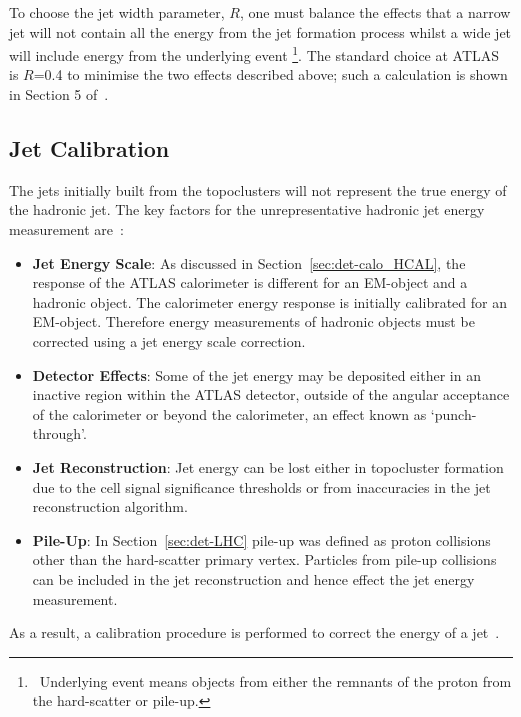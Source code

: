 To choose the jet width parameter, $R$, one must balance the effects that
a narrow jet will not contain all the energy from the jet formation process
whilst a wide jet will include energy from the underlying event \footnote{\  Underlying event means objects from either the remnants of the proton from the hard-scatter or pile-up.}.
The standard choice at ATLAS is $R$=0.4 to minimise the  two effects described above;
such a calculation is shown in Section 5 of~\cite{obj-jets_reco_salam}.


\subsection{Jet Calibration}
\label{sec:obj-jets_calib}

The jets initially built from the topoclusters will not represent the true energy of the hadronic jet.
The key factors for the unrepresentative hadronic jet energy measurement are~\cite{det-thesis_kate,obj-jets_calib_2015}:
\begin{itemize}[leftmargin=*]
\item\textbf{Jet Energy Scale}:
  As discussed in Section~\ref{sec:det-calo_HCAL}, the response of the ATLAS calorimeter is different for an EM-object and a hadronic object.
  The calorimeter energy response is initially calibrated for an EM-object.
  Therefore energy measurements of hadronic objects must be corrected using a jet energy scale correction. \vspace{0.5em}
\item\textbf{Detector Effects}:
  Some of the jet energy may be deposited either in an inactive region within the ATLAS detector,
  outside of the angular acceptance of the calorimeter or beyond the calorimeter, an effect known as `punch-through'.\vspace{0.5em}
\item\textbf{Jet Reconstruction}:
  Jet energy can be lost either in topocluster formation due to the cell signal significance thresholds
  or from inaccuracies in the jet reconstruction algorithm.\vspace{0.5em}
\item\textbf{Pile-Up}:
  In Section~\ref{sec:det-LHC} pile-up was defined as proton collisions other than the hard-scatter primary vertex.
  Particles from pile-up collisions can be included in the jet reconstruction and hence effect the jet energy measurement.
\end{itemize}
\vspace{-0.5em}
As a result, a calibration procedure is performed to correct the energy of a jet~\cite{obj-jets_calib_run2}.


